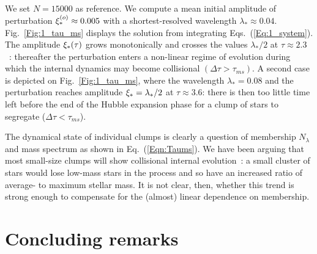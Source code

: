 We set $N = 15 000$ as reference. %
We compute a mean initial amplitude of perturbation $\xi_\ast^{(o)} \approx 0.005 $ with a shortest-resolved wavelength $\lambda_\ast \approx 0.04$. Fig.~\ref{Fig:1_tau_ms} displays the solution from integrating Eqs.~(\ref{Eq:1_system}). The amplitude $\xi_\ast(\tau)$ grows monotonically and crosses the values $\lambda_\ast/2$ at $\tau \approx 2.3$~: thereafter the perturbation enters a non-linear regime of evolution during which the internal dynamics may become collisional $( \Delta\tau > \tau_{ms})$. A second case is depicted on Fig.~\ref{Fig:1_tau_ms}, where the wavelength $\lambda_\ast = 0.08$ and the perturbation reaches amplitude $\xi_\ast = \lambda_\ast/2$ at $\tau \approx 3.6$: there is then too little time left before the end of the Hubble expansion phase for a clump of stars to segregate ($\Delta\tau < \tau_{ms}$). 





The dynamical state of individual clumps is clearly a question of membership $N_\lambda$ and mass spectrum as shown in Eq.~(\ref{Eqn:Taums}). We have been arguing that most small-size clumps will show collisional internal evolution~: a small cluster of stars would lose low-mass stars in the process and so have an increased ratio of average-    to maximum stellar mass. It is not clear, then, whether this trend is strong enough to compensate for the (almost) linear dependence on membership. 





\section{Concluding remarks}

